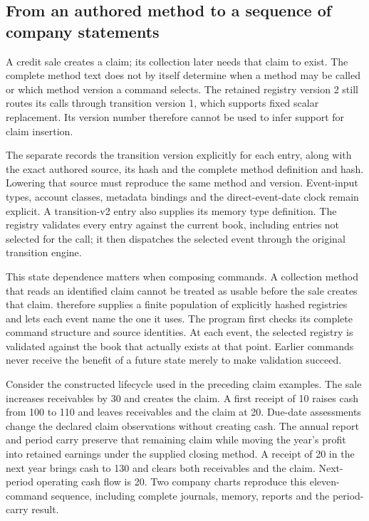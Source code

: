 \subsection{From an authored method to a sequence of company statements}
\label{sec:authored-program-composition}

A credit sale creates a claim; its collection later needs that claim to exist.
The complete method text does not by itself determine when a method may be
called or which method version a command selects. The retained registry version
2 still routes its calls through transition version 1, which supports fixed
scalar replacement. Its version number therefore cannot be used to infer
support for claim insertion.

The separate  records the transition version
explicitly for each entry, along with the exact authored source, its hash and
the complete method definition and hash. Lowering that source must reproduce
the same method and version. Event-input types, account classes, metadata
bindings and the direct-event-date clock remain explicit. A transition-v2
entry also supplies its memory type definition. The registry validates every
entry against the current book, including entries not selected for the call;
it then dispatches the selected event through the original transition engine.

This state dependence matters when composing commands. A collection method
that reads an identified claim cannot be treated as usable before the sale
creates that claim.  therefore supplies a finite
population of explicitly hashed registries and lets each event name the one
it uses. The program first checks its complete command structure and source
identities. At each event, the selected registry is validated against the book
that actually exists at that point. Earlier commands never receive the benefit
of a future state merely to make validation succeed.

Consider the constructed lifecycle used in the preceding claim examples.
The sale increases receivables by 30 and creates the claim. A first receipt of
10 raises cash from 100 to 110 and leaves receivables and the claim at 20.
Due-date assessments change the declared claim observations without creating
cash. The annual report and period carry preserve that remaining claim while
moving the year's profit into retained earnings under the supplied closing
method. A receipt of 20 in the next year brings cash to 130 and clears both
receivables and the claim. Next-period operating cash flow is 20. Two company
charts reproduce this eleven-command sequence, including complete journals,
memory, reports and the period-carry result.

